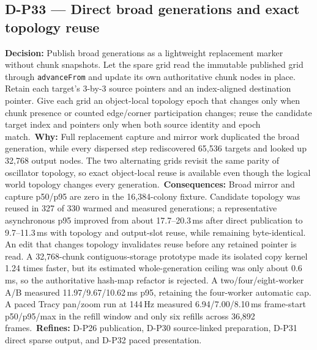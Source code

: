 \subsection*{D-P33 --- Direct broad generations and exact topology reuse}
\begin{decisionbox}[title={D-P33 \quad 2026-08-17}]
\textbf{Decision:} Publish broad generations as a lightweight replacement
marker without chunk snapshots. Let the spare grid read the immutable published
grid through \texttt{advanceFrom} and update its own authoritative chunk nodes
in place. Retain each target's 3-by-3 source pointers and an index-aligned
destination pointer. Give each grid an object-local topology epoch that changes
only when chunk presence or counted edge/corner participation changes; reuse the
candidate target index and pointers only when both source identity and epoch
match.\
\textbf{Why:} Full replacement capture and mirror work duplicated the broad
generation, while every dispersed step rediscovered 65,536 targets and looked
up 32,768 output nodes. The two alternating grids revisit the same parity of
oscillator topology, so exact object-local reuse is available even though the
logical world topology changes every generation.\
\textbf{Consequences:} Broad mirror and capture p50/p95 are zero in the
16,384-colony fixture. Candidate topology was reused in 327 of 330 warmed and
measured generations; a representative asynchronous p95 improved from about
17.7--20.3\,ms after direct publication to 9.7--11.3\,ms with topology and
output-slot reuse, while remaining byte-identical. An edit that changes
topology invalidates reuse before any retained pointer is read. A 32,768-chunk
contiguous-storage prototype made its isolated copy kernel 1.24 times faster,
but its estimated whole-generation ceiling was only about 0.6\,ms, so the
authoritative hash-map refactor is rejected. A two/four/eight-worker A/B measured
11.97/9.67/10.62\,ms p95, retaining the four-worker automatic cap. A paced Tracy
pan/zoom run at 144\,Hz measured 6.94/7.00/8.10\,ms frame-start p50/p95/max in
the refill window and only six refills across 36,892 frames.\
\textbf{Refines:} D-P26 publication, D-P30 source-linked preparation, D-P31
direct sparse output, and D-P32 paced presentation.
\end{decisionbox}

